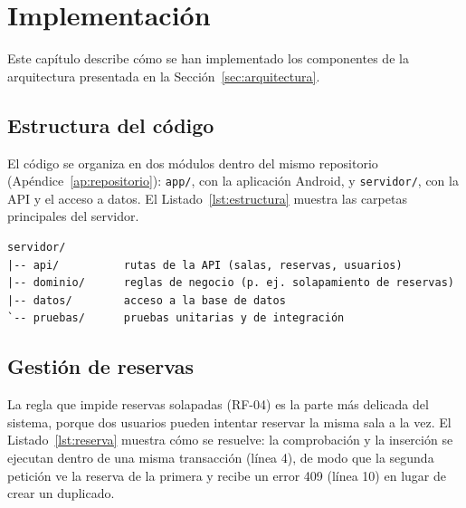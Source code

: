 \chapter{Implementación}
\label{cap:implementacion}

Este capítulo describe cómo se han implementado los componentes de la
arquitectura presentada en la Sección~\ref{sec:arquitectura}.

\section{Estructura del código}
\label{sec:estructura-codigo}

El código se organiza en dos módulos dentro del mismo repositorio
(Apéndice~\ref{ap:repositorio}): \texttt{app/}, con la aplicación Android, y
\texttt{servidor/}, con la \ac{API} y el acceso a datos. El
Listado~\ref{lst:estructura} muestra las carpetas principales del servidor.

\begin{lstlisting}[float, language={}, numbers=none, caption={Estructura de carpetas del servidor.},
                   label={lst:estructura}]
servidor/
|-- api/          rutas de la API (salas, reservas, usuarios)
|-- dominio/      reglas de negocio (p. ej. solapamiento de reservas)
|-- datos/        acceso a la base de datos
`-- pruebas/      pruebas unitarias y de integración
\end{lstlisting}

\section{Gestión de reservas}
\label{sec:gestion-reservas}

La regla que impide reservas solapadas (RF-04) es la parte más delicada del
sistema, porque dos usuarios pueden intentar reservar la misma sala a la vez. El
Listado~\ref{lst:reserva} muestra cómo se resuelve: la comprobación y la
inserción se ejecutan dentro de una misma transacción (línea 4), de modo que la
segunda petición ve la reserva de la primera y recibe un error 409 (línea 10) en
lugar de crear un duplicado.

